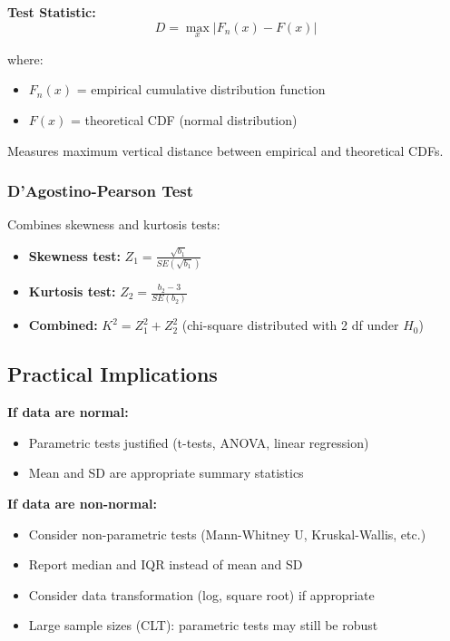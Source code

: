 \documentclass[12pt,a4paper]{article}
\begin{document}
\textbf{Test Statistic:}
\begin{equation}
D = \max_{x} |F_n(x) - F(x)|
\end{equation}

where:
\begin{itemize}
    \item $F_n(x)$ = empirical cumulative distribution function
    \item $F(x)$ = theoretical CDF (normal distribution)
\end{itemize}

Measures maximum vertical distance between empirical and theoretical CDFs.

\subsubsection{D'Agostino-Pearson Test}

Combines skewness and kurtosis tests:
\begin{itemize}
    \item \textbf{Skewness test:} $Z_1 = \frac{\sqrt{b_1}}{SE(\sqrt{b_1})}$
    \item \textbf{Kurtosis test:} $Z_2 = \frac{b_2 - 3}{SE(b_2)}$
    \item \textbf{Combined:} $K^2 = Z_1^2 + Z_2^2$ (chi-square distributed with 2 df under $H_0$)
\end{itemize}

\subsection{Practical Implications}

\textbf{If data are normal:}
\begin{itemize}
    \item Parametric tests justified (t-tests, ANOVA, linear regression)
    \item Mean and SD are appropriate summary statistics
\end{itemize}

\textbf{If data are non-normal:}
\begin{itemize}
    \item Consider non-parametric tests (Mann-Whitney U, Kruskal-Wallis, etc.)
    \item Report median and IQR instead of mean and SD
    \item Consider data transformation (log, square root) if appropriate
    \item Large sample sizes (CLT): parametric tests may still be robust
\end{itemize}
\end{document}
